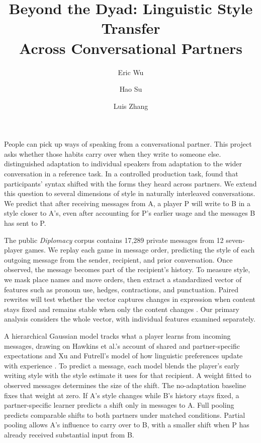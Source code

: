 \documentclass[sigconf,nonacm]{acmart}
\begin{document}
\title{Beyond the Dyad: Linguistic Style Transfer\texorpdfstring{\\}{ }Across Conversational Partners}

\author{Eric Wu}
\author{Hao Su}
\author{Luis Zhang}

\maketitle
\balance

People can pick up ways of speaking from a conversational partner. This project asks whether those habits carry over when they write to someone else. \citet{Kronm_ller_2026} distinguished adaptation to individual speakers from adaptation to the wider conversation in a reference task. In a controlled production task, \citet{Ostrand_2019} found that participants' syntax shifted with the forms they heard across partners. We extend this question to several dimensions of style in naturally interleaved conversations. We predict that after receiving messages from A, a player P will write to B in a style closer to A's, even after accounting for P's earlier usage and the messages B has sent to P.

The public \textit{Diplomacy} corpus \citep{peskov-etal-2020-takes} contains 17,289 private messages from 12 seven-player games. We replay each game in message order, predicting the style of each outgoing message from the sender, recipient, and prior conversation. Once observed, the message becomes part of the recipient's history. To measure style, we mask place names and move orders, then extract a standardized vector of features such as pronoun use, hedges, contractions, and punctuation. Paired rewrites will test whether the vector captures changes in expression when content stays fixed and remains stable when only the content changes \citep{Halvani_2021,wegmann-etal-2022-author}. Our primary analysis considers the whole vector, with individual features examined separately.

A hierarchical Gaussian model tracks what a player learns from incoming messages, drawing on Hawkins et al.'s account of shared and partner-specific expectations and Xu and Futrell's model of how linguistic preferences update with experience \citep{Hawkins_2023,xu2024hierarchicalbayesianmodelsyntactic}. To predict a message, each model blends the player's early writing style with the style estimate it uses for that recipient. A weight fitted to observed messages determines the size of the shift. The no-adaptation baseline fixes that weight at zero. If A's style changes while B's history stays fixed, a partner-specific learner predicts a shift only in messages to A. Full pooling predicts comparable shifts to both partners under matched conditions. Partial pooling allows A's influence to carry over to B, with a smaller shift when P has already received substantial input from B.
\end{document}
